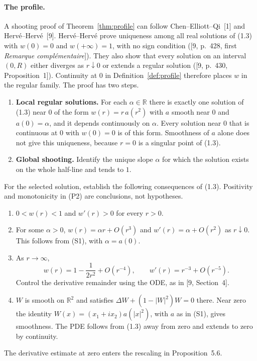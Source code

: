 \documentclass[11pt]{amsart}
\theoremstyle{definition}
\newcommand{\R}{\mathbb{R}}
\begin{document}
\paragraph{The profile.}
A shooting proof of Theorem~\ref{thm:profile} can follow Chen--Elliott--Qi~[1]
and Herv\'e--Herv\'e~[9]. Herv\'e--Herv\'e prove uniqueness among all real
solutions of (1.3) with $w(0)=0$ and $w(+\infty)=1$, with no sign condition
([9, p.~428, first \emph{Remarque compl\'ementaire}]). They also show that every
solution on an interval $(0,R)$ either diverges as $r\downarrow0$ or extends a
regular solution ([9, p.~430, Proposition~1]). Continuity at $0$ in
Definition~\ref{def:profile} therefore places $w$ in the regular family.
The proof has two steps.
\begin{enumerate}[label=(S\arabic*)]
  \item \textbf{Local regular solutions.} For each $\alpha\in\R$ there is exactly
        one solution of (1.3) near $0$ of the form $w(r)=r\,a(r^2)$ with $a$ smooth
        near $0$ and $a(0)=\alpha$, and it depends continuously on $\alpha$.
        Every solution near $0$ that is continuous at $0$ with $w(0)=0$ is of this
        form. Smoothness of $a$ alone does not give this uniqueness, because $r=0$
        is a singular point of (1.3).
  \item \textbf{Global shooting.} Identify the unique slope $\alpha$ for which the
        solution exists on the whole half-line and tends to $1$.
\end{enumerate}
For the selected solution, establish the following consequences of (1.3).
Positivity and monotonicity in (P2) are conclusions, not hypotheses.
\begin{enumerate}[label=(P\arabic*),start=2]
  \item $0<w(r)<1$ and $w'(r)>0$ for every $r>0$.
  \item For some $\alpha>0$, $w(r)=\alpha r+O(r^3)$ and
        $w'(r)=\alpha+O(r^2)$ as $r\downarrow0$. This follows from (S1),
        with $\alpha=a(0)$.
  \item As $r\to\infty$,
        \[
          w(r)=1-\frac{1}{2r^2}+O(r^{-4}),\qquad
          w'(r)=r^{-3}+O(r^{-5}). \tag{1.4}
        \]
        Control the derivative remainder using the ODE, as in [9, Section~4].
  \item $W$ is smooth on $\R^2$ and satisfies $\Delta W+(1-|W|^2)W=0$ there.
        Near zero the identity $W(x)=(x_1+i x_2)a(|x|^2)$, with $a$ as in (S1),
        gives smoothness.
        The PDE follows from (1.3) away from zero and extends to zero by continuity.
\end{enumerate}
The derivative estimate at zero enters the rescaling in Proposition~5.6.
\end{document}
